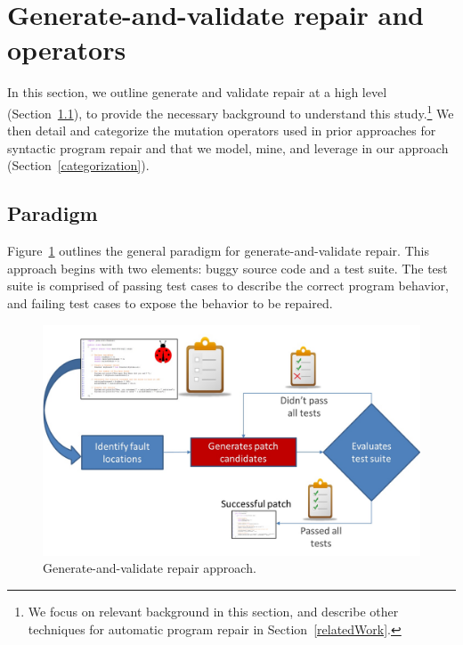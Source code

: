 \documentclass[conference]{IEEEtran}
\begin{document}
\section{Generate-and-validate repair and operators} 
\label{background}

In this section, we outline generate and validate repair at a high level
(Section~\ref{sec-paradigm}), to provide the necessary background to understand this study.\footnote{We focus on relevant background in this section, and describe
  other techniques for automatic program repair in Section~\ref{relatedWork}.}
  We then detail and categorize the mutation operators used in prior approaches
  for syntactic program repair and that we model, mine, and leverage in our approach
(Section~\ref{categorization}).  
 
 
\subsection{Paradigm}
\label{sec-paradigm}


Figure~\ref{fig:generateandvalidate} outlines the general paradigm for generate-and-validate repair. This approach begins with two elements: buggy source code and a test suite. The test suite is comprised of passing
test cases to describe the correct program behavior, and failing test 
cases to expose the behavior to be repaired.

\begin{figure}[!h]
  \centering
    \includegraphics[width=\columnwidth]{Picture1}
  \caption{Generate-and-validate repair approach.}
  \label{fig:generateandvalidate}
\end{figure}
\end{document}
